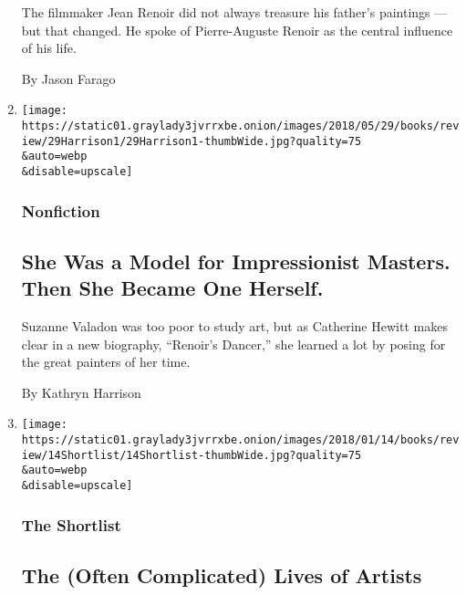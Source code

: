 \begin{enumerate}
  The filmmaker Jean Renoir did not always treasure his father's
  paintings --- but that changed. He spoke of Pierre-Auguste Renoir as
  the central influence of his life.

  By Jason Farago
\item
  \href{/2018/05/29/books/review/renoirs-dancer-suzanne-valadon-catherine-hewitt.html}{}

  \texttt{[image: https://static01.graylady3jvrrxbe.onion/images/2018/05/29/books/review/29Harrison1/29Harrison1-thumbWide.jpg?quality=75\\\&auto=webp\\\&disable=upscale]}

  \hypertarget{nonfiction}{%
  \subsubsection{Nonfiction}\label{nonfiction}}

  \hypertarget{she-was-a-model-for-impressionist-masters-then-she-became-one-herself}{%
  \subsection{She Was a Model for Impressionist Masters. Then She Became
  One
  Herself.}\label{she-was-a-model-for-impressionist-masters-then-she-became-one-herself}}

  Suzanne Valadon was too poor to study art, but as Catherine Hewitt
  makes clear in a new biography, ``Renoir's Dancer,'' she learned a lot
  by posing for the great painters of her time.

  By Kathryn Harrison
\item
  \href{/2018/01/12/books/review/artist-biography-vivian-maier.html}{}

  \texttt{[image: https://static01.graylady3jvrrxbe.onion/images/2018/01/14/books/review/14Shortlist/14Shortlist-thumbWide.jpg?quality=75\\\&auto=webp\\\&disable=upscale]}

  \hypertarget{the-shortlist}{%
  \subsubsection{The Shortlist}\label{the-shortlist}}

  \hypertarget{the-often-complicated-lives-of-artists}{%
  \subsection{The (Often Complicated) Lives of
  Artists}\label{the-often-complicated-lives-of-artists}}


\end{enumerate}
